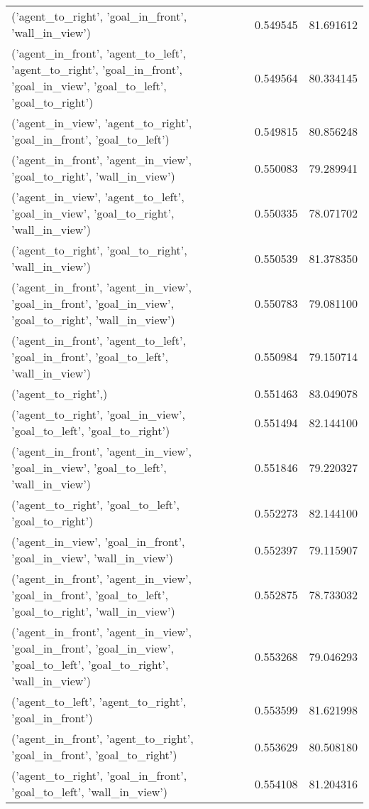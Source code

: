 \begin{tabular}{lrr}
('agent\_to\_right', 'goal\_in\_front', 'wall\_in\_view') & 0.549545 & 81.691612 \\
('agent\_in\_front', 'agent\_to\_left', 'agent\_to\_right', 'goal\_in\_front', 'goal\_in\_view', 'goal\_to\_left', 'goal\_to\_right') & 0.549564 & 80.334145 \\
('agent\_in\_view', 'agent\_to\_right', 'goal\_in\_front', 'goal\_to\_left') & 0.549815 & 80.856248 \\
('agent\_in\_front', 'agent\_in\_view', 'goal\_to\_right', 'wall\_in\_view') & 0.550083 & 79.289941 \\
('agent\_in\_view', 'agent\_to\_left', 'goal\_in\_view', 'goal\_to\_right', 'wall\_in\_view') & 0.550335 & 78.071702 \\
('agent\_to\_right', 'goal\_to\_right', 'wall\_in\_view') & 0.550539 & 81.378350 \\
('agent\_in\_front', 'agent\_in\_view', 'goal\_in\_front', 'goal\_in\_view', 'goal\_to\_right', 'wall\_in\_view') & 0.550783 & 79.081100 \\
('agent\_in\_front', 'agent\_to\_left', 'goal\_in\_front', 'goal\_to\_left', 'wall\_in\_view') & 0.550984 & 79.150714 \\
('agent\_to\_right',) & 0.551463 & 83.049078 \\
('agent\_to\_right', 'goal\_in\_view', 'goal\_to\_left', 'goal\_to\_right') & 0.551494 & 82.144100 \\
('agent\_in\_front', 'agent\_in\_view', 'goal\_in\_view', 'goal\_to\_left', 'wall\_in\_view') & 0.551846 & 79.220327 \\
('agent\_to\_right', 'goal\_to\_left', 'goal\_to\_right') & 0.552273 & 82.144100 \\
('agent\_in\_view', 'goal\_in\_front', 'goal\_in\_view', 'wall\_in\_view') & 0.552397 & 79.115907 \\
('agent\_in\_front', 'agent\_in\_view', 'goal\_in\_front', 'goal\_to\_left', 'goal\_to\_right', 'wall\_in\_view') & 0.552875 & 78.733032 \\
('agent\_in\_front', 'agent\_in\_view', 'goal\_in\_front', 'goal\_in\_view', 'goal\_to\_left', 'goal\_to\_right', 'wall\_in\_view') & 0.553268 & 79.046293 \\
('agent\_to\_left', 'agent\_to\_right', 'goal\_in\_front') & 0.553599 & 81.621998 \\
('agent\_in\_front', 'agent\_to\_right', 'goal\_in\_front', 'goal\_to\_right') & 0.553629 & 80.508180 \\
('agent\_to\_right', 'goal\_in\_front', 'goal\_to\_left', 'wall\_in\_view') & 0.554108 & 81.204316 \\

\end{tabular}
